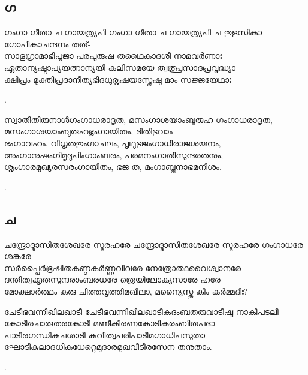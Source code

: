 \subsection{ഗ}

\begin{enumerate}


\begin{slokam}{\VSr}{\Melp}{ഗംഗാ ഗീതാ ച ഗായത്ര്യപി}
ഗംഗാ ഗീതാ ച ഗായത്ര്യപി ച തുളസികാ ഗോപികാചന്ദനം തത്-\\
സാളഗ്രാമാഭിപൂജാ പരപുരുഷ തഥൈകാദശീ നാമവർണാഃ\\
ഏതാന്യഷ്ടാപ്യയത്നാന്യയി കലിസമയേ ത്വത്പ്രസാദപ്രവൃദ്ധ്യാ \\
ക്ഷിപ്രം മുക്തിപ്രദാനീത്യഭിദധുരൃഷയസ്തേഷു മാം സജ്ജയേഥാഃ
\end{slokam}


.


\begin{slokam}{\VMt}{സ്വാതിതിരുനാൾ}{ഗംഗാധരാദൃത, മസംഗാശയാംബുരുഹ}
ഗംഗാധരാദൃത, മസംഗാശയാംബുരുഹഭൃംഗായിതം, ദിതിഭുവാം\\
ഭംഗാവഹം, വിധൃതതുംഗാചലം, പൃഥുഭുജംഗാധിരാജശയനം,\\
അംഗാനുഷംഗിമൃദുപിംഗാംബരം, പരമനംഗാതിസുന്ദരതനും,\\
ശൃംഗാരമുഖ്യരസരംഗായിതം, ഭജ ത, മംഗാബ്ജനാഭമനിശം.
\end{slokam}


.

\end{enumerate}

\subsection{ച}


\begin{enumerate}

\begin{slokam}{\VSv}{\Sank}{ചന്ദ്രോദ്ഭാസിതശേഖരേ സ്മരഹരേ}
ചന്ദ്രോദ്ഭാസിതശേഖരേ സ്മരഹരേ ഗംഗാധരേ ശങ്കരേ \\
സർപ്പൈർഭൂഷിതകണ്ഠകർണ്ണവിവരേ നേത്രോത്ഥവൈശ്വാനരേ \\
ദന്തിത്വക്കൃതസുന്ദരാംബരധരേ ത്രെയിലോക്യസാരേ ഹരേ \\
മോക്ഷാർത്ഥം കുരു ചിത്തവൃത്തിമഖിലാ, മന്യൈസ്തു കിം കർമ്മദിഃ?
\end{slokam}


\begin{slokam}{\VMt}{\Sank}{ചേടീഭവന്നിഖിലഖാടീ}
ചേടീഭവന്നിഖിലഖാടീകദംബതരുവാടീഷു നാകിപടലീ-\\
കോടീരചാരുതരകോടീ മണീകിരണകോടീകരംബിതപദാ\\
പാടീരഗന്ധികുചശാടീ കവിത്വപരിപാടീമഗാധിപസുതാ\\
ഘോടീകുലാദധികധേറ്റെമുദാരമുഖവീടീരസേന തനുതാം.
\end{slokam}


.

\end{enumerate}


